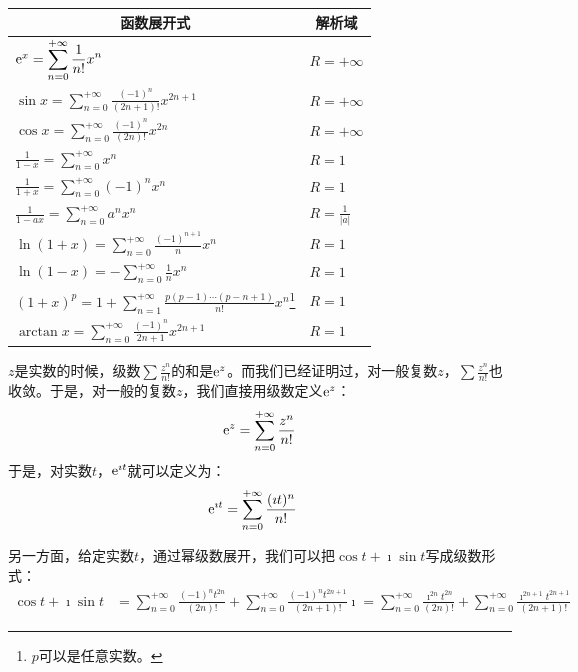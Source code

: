 \documentclass[12pt,UTF8]{ctexbook}
\begin{document}
\begin{center}
    \renewcommand{\arraystretch}{2}
    \setlength{\extrarowheight}{-3pt}
    \begin{longtable}{|l|l|}
        \hline \multicolumn{1}{|c|}{\textbf{函数展开式}} & \multicolumn{1}{c|}{\textbf{解析域}} \\ 
        \hline         
        $\mathrm{e}^x = \displaystyle  \sum_{n=0}^{+\infty} \frac{1}{n!} x^n $ & $R=+\infty$ \\  
        \hline
        $\sin{x} = \displaystyle  \sum_{n=0}^{+\infty} \frac{(-1)^n}{(2n+1)!} x^{2n+1} $ & $R=+\infty$ \\ 
        \hline
        $\cos{x} = \displaystyle  \sum_{n=0}^{+\infty} \frac{(-1)^n}{(2n)!} x^{2n} $ & $R=+\infty$ \\
        \hline
        $\displaystyle \frac{1}{1 - x} = \sum_{n=0}^{+\infty} x^n $ & $R = 1$ \\
        \hline
        $\displaystyle \frac{1}{1 + x} = \displaystyle  \sum_{n=0}^{+\infty} (-1)^n x^n $ & $R = 1$ \\
        \hline
        $\displaystyle \frac{1}{1 - ax} = \displaystyle  \sum_{n=0}^{+\infty} a^n x^n $ & $R = \frac{1}{|a|}$ \\
        \hline
        $\ln{(1 + x)} = \displaystyle  \sum_{n=0}^{+\infty} \frac{(-1)^{n+1}}{n} x^n $ & $R = 1$ \\
        \hline
        $\ln{(1 - x)} = \displaystyle  -\sum_{n=0}^{+\infty} \frac{1}{n} x^n $ & $R = 1$ \\
        \hline
        $(1 + x)^p = \displaystyle 1 + \sum_{n=1}^{+\infty} \frac{p(p - 1)\cdots(p - n + 1)}{n!} x^n $\footnote{$p$可以是任意实数。} & $R = 1$ \\
        \hline
        $\arctan{x} = \displaystyle  \sum_{n=0}^{+\infty} \frac{(-1)^n}{2n + 1} x^{2n+1} $ & $R=1$ \\
        \hline
    \end{longtable}
\end{center}

$z$是实数的时候，级数$\sum \frac{z^{n}}{n!}$的和是$\mathrm{e}^{z}$。而我们已经证明过，对一般复数$z$，$\sum \frac{z^{n}}{n!}$也收敛。于是，对一般的复数$z$，我们直接用级数定义$\mathrm{e}^z$：
$$ \mathrm{e}^{z} = \sum_{n=0}^{+\infty} \frac{z^{n}}{n!} $$
于是，对实数$t$，$\mathrm{e}^{\imath t}$就可以定义为：
\begin{align*}
    \mathrm{e}^{\imath t} &= \sum_{n=0}^{+\infty} \frac{(\imath t)^{n}}{n!}
\end{align*}

另一方面，给定实数$t$，通过幂级数展开，我们可以把$\cos{t} + \imath \sin{t}$写成级数形式：
\begin{align*}
    \cos{t} + \imath \sin{t} &= \sum_{n=0}^{+\infty} \frac{(-1)^nt^{2n}}{(2n)!} + \sum_{n=0}^{+\infty} \frac{(-1)^nt^{2n+1}}{(2n+1)!}\imath = \sum_{n=0}^{+\infty} \frac{\imath^{2n}t^{2n}}{(2n)!} + \sum_{n=0}^{+\infty} \frac{\imath^{2n+1}t^{2n+1}}{(2n+1)!}
\end{align*}
\end{document}
